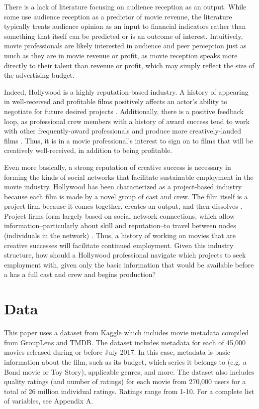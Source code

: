 \documentclass[12pt,english]{article}
\begin{document}
There is a lack of literature focusing on audience reception as an output. While some \citep{apala} use audience reception as a predictor of movie revenue, the literature typically treats audience opinion as an input to financial indicators rather than something that itself can be predicted or is an outcome of interest. Intuitively, movie professionals are likely interested in audience and peer perception just as much as they are in movie revenue or profit, as movie reception speaks more directly to their talent than revenue or profit, which may simply reflect the size of the advertising budget.

Indeed, Hollywood is a highly reputation-based industry. A history of appearing in well-received and profitable films positively affects an actor's ability to negotiate for future desired projects \citep{ebbers}. Additionally, there is a positive feedback loop, as professional crew members with a history of award success tend to work with other frequently-award professionals and produce more creatively-lauded films \cite{cattani}. Thus, it is in a movie professional's interest to sign on to films that will be creatively well-received, in addition to being profitable.

Even more basically, a strong reputation of creative success is necessary in forming the kinds of social networks that facilitate sustainable employment in the movie industry. Hollywood has been characterized as a project-based industry because each film is made by a novel group of cast and crew. The film itself is a project firm because it comes together, creates an output, and then dissolves \cite{ferriani, jones}. Project firms form largely based on social network connections, which allow information--particularly about skill and reputation--to travel between nodes (individuals in the network) \citep{jones}. Thus, a history of working on movies that are creative successes will facilitate continued employment. Given this industry structure, how should a Hollywood professional navigate which projects to seek employment with, given only the basic information that would be available before a has a full cast and crew and begins production?


\section{Data}
This paper uses a \href{https://www.kaggle.com/rounakbanik/the-movies-dataset#movies_metadata.csv}{dataset} from Kaggle which includes movie metadata compiled from GroupLens and TMDB. The dataset includes metadata for each of 45,000 movies released during or before July 2017. In this case, metadata is basic information about the film, such as its budget, which series it belongs to (e.g. a Bond movie or Toy Story), applicable genres, and more. The dataset also includes quality ratings (and number of ratings) for each movie from 270,000 users for a total of 26 million individual ratings. Ratings range from 1-10. For a complete list of variables, see Appendix A. 
\end{document}
